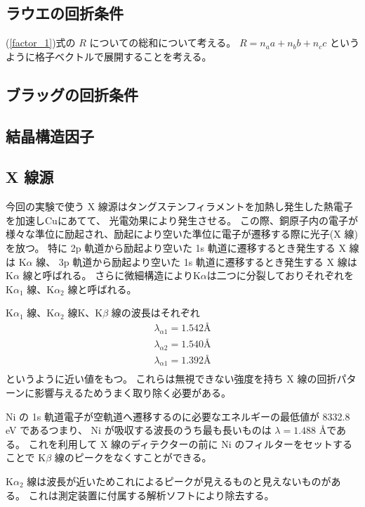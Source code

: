 \documentclass[11pt,dvipdfmx,a4paper]{jsarticle}
\begin{document}
\subsection{ラウエの回折条件}
(\ref{factor_1})式の \(R\) についての総和について考える。
\(R = n_a a + n_b b + n_c c\) というように格子ベクトルで展開することを考える。

\subsection{ブラッグの回折条件}
\subsection{結晶構造因子}
\subsection{X 線源}
今回の実験で使う X 線源はタングステンフィラメントを加熱し発生した熱電子を加速しCuにあてて、
光電効果により発生させる。
この際、銅原子内の電子が様々な準位に励起され、励起により空いた準位に電子が遷移する際に光子(X 線)を放つ。
特に
2p 軌道から励起より空いた 1s 軌道に遷移するとき発生する X 線は K\(\alpha\) 線、
3p 軌道から励起より空いた 1s 軌道に遷移するとき発生する X 線は K\(\alpha\) 線と呼ばれる。
さらに微細構造によりK\(\alpha\)は二つに分裂しておりそれぞれを
K\(\alpha_1\) 線、K\(\alpha_2\) 線と呼ばれる。

K\(\alpha_1\) 線、K\(\alpha_2\) 線K、K\(\beta\) 線の波長はそれぞれ
\begin{align}
	\lambda_{\alpha1} = 1.542 \text{\AA}\\
	\lambda_{\alpha2} = 1.540 \text{\AA}\\
	\lambda_{\alpha1} = 1.392 \text{\AA}\\
\end{align}
というように近い値をもつ。\cite{rikanenpyo}
これらは無視できない強度を持ち X 線の回折パターンに影響与えるためうまく取り除く必要がある。

Ni の 1s 軌道電子が空軌道へ遷移するのに必要なエネルギーの最低値が 8332.8 eV であるつまり、
Ni が吸収する波長のうち最も長いものは \(\lambda = 1.488\) \AA である。
これを利用して X 線のディテクターの前に Ni のフィルターをセットすることで K\(\beta\) 線のピークをなくすことができる。

K\(\alpha_2\) 線は波長が近いためこれによるピークが見えるものと見えないものがある。
これは測定装置に付属する解析ソフトにより除去する。
\end{document}

